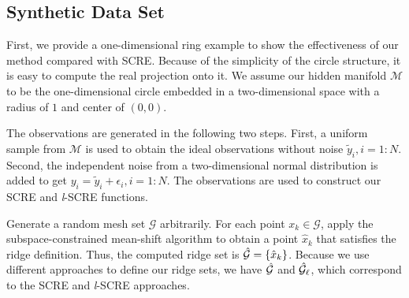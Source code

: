 \documentclass[aos,preprint]{imsart}
\theoremstyle{remark}
\begin{document}
\subsection{Synthetic Data Set}
First, we provide a one-dimensional ring example to show the effectiveness of our method compared with SCRE. Because of the simplicity of the circle structure, it is easy to compute the real projection onto it. We assume our hidden manifold ${\mathcal M}$ to be the one-dimensional circle embedded in a two-dimensional space with a radius of $1$ and center of $(0,0)$.

The observations are generated in the following two steps. First, a uniform sample from ${\mathcal M}$ is used to obtain the ideal observations without noise $\tilde{y}_i, i = 1:N$. Second, the independent noise from a two-dimensional normal distribution is added to get $y_i = \tilde{y}_i+\epsilon_i, i=1:N$. The observations are used to construct our SCRE and {\it l}-SCRE functions.

Generate a random mesh set $\mathcal G$ arbitrarily. For each point $x_k \in \mathcal G$, apply the subspace-constrained mean-shift algorithm to obtain a point $\hat{x}_k$ that satisfies the ridge definition. Thus, the computed ridge set is ${\cal \hat{G}}=\{\hat{x}_k\}$. Because we use different approaches to define our ridge sets, we have ${\cal \hat{G}}$ and ${\cal \hat{G}}_\ell$, which correspond to the SCRE and {\it l}-SCRE approaches.
\end{document}
